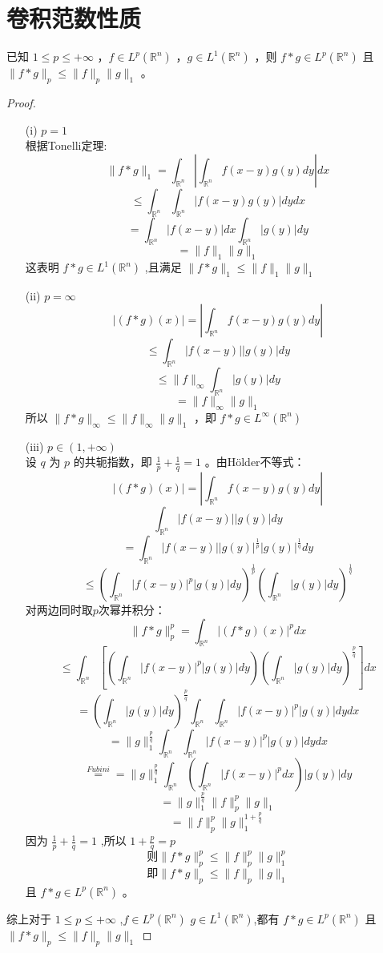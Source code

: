 \documentclass[linespread=1.5,openany]{book}%
\theoremstyle{plain}
\begin{document}
{{				\section{卷积范数性质}
				已知 \(1\leq p\leq +\infty\) ，\(f\in L^p(\mathbb{R}^n)\) ，\(g\in L^1(\mathbb{R}^n)\) ，则 \(f * g\in L^p(\mathbb{R}^n)\) 且 \(\|f * g\|_p\leq\|f\|_p\|g\|_1\) 。
				\begin{proof}
					\begin{itemize}	
						\item [(i)]\(p = 1\)\\
						根据Tonelli定理:\[\|f * g\|_1=\int_{\mathbb{R}^n}\left|\int_{\mathbb{R}^n}f(x - y)g(y)dy\right|dx\]
						\[ \leq\int_{\mathbb{R}^n}\int_{\mathbb{R}^n}|f(x - y)g(y)|dydx\]
						\[ =\int_{\mathbb{R}^n}|f(x - y)|dx\int_{\mathbb{R}^n}|g(y)|dy\]
						\[ =\|f\|_1\|g\|_1\]
						这表明 \(f * g\in L^1(\mathbb{R}^n)\) ,且满足 \(\|f * g\|_1\leq\|f\|_1\|g\|_1\)
						\item [(ii)]\(p = \infty\)\\
						\[|(f * g)(x)|=\left|\int_{\mathbb{R}^n}f(x - y)g(y)dy\right|\]
						\[\leq\int_{\mathbb{R}^n}|f(x - y)||g(y)|dy\]
						\[\leq\|f\|_{\infty}\int_{\mathbb{R}^n}|g(y)|dy\]
						\[=\|f\|_{\infty}\|g\|_1	\]
						所以 \(\|f * g\|_{\infty}\leq\|f\|_{\infty}\|g\|_1\) ，即 \(f * g\in L^{\infty}(\mathbb{R}^n)\) 
						\item [(iii)]\(p\in(1, +\infty)\)\\
						设 \(q\) 为 \(p\) 的共轭指数，即 \(\frac{1}{p}+\frac{1}{q}=1\) 。由Hölder不等式：
						\[
						|(f * g)(x)|=\left|\int_{\mathbb{R}^n}f(x - y)g(y)dy\right|\]
						\[ \int_{\mathbb{R}^n}|f(x - y)||g(y)|dy\]
						\[ =\int_{\mathbb{R}^n}|f(x - y)||g(y)|^{\frac{1}{p}}|g(y)|^{\frac{1}{q}}dy\]
						\[\leq\left(\int_{\mathbb{R}^n}|f(x - y)|^p|g(y)|dy\right)^{\frac{1}{p}}\left(\int_{\mathbb{R}^n}|g(y)|dy\right)^{\frac{1}{q}}
						\]
						对两边同时取\(p\)次幂并积分：
						\[
						\|f * g\|_p^p=\int_{\mathbb{R}^n}|(f * g)(x)|^pdx\]
						\[\leq\int_{\mathbb{R}^n}\left[\left(\int_{\mathbb{R}^n}|f(x - y)|^p|g(y)|dy\right)\left(\int_{\mathbb{R}^n}|g(y)|dy\right)^{\frac{p}{q}}\right]dx\]
						\[=\left(\int_{\mathbb{R}^n}|g(y)|dy\right)^{\frac{p}{q}}\int_{\mathbb{R}^n}\int_{\mathbb{R}^n}|f(x - y)|^p|g(y)|dydx\]
						\[=\|g\|_1^{\frac{p}{q}}\int_{\mathbb{R}^n}\int_{\mathbb{R}^n}|f(x - y)|^p|g(y)|dydx\] 
						\[\stackrel{Fubini}{=}
						=\|g\|_1^{\frac{p}{q}}\int_{\mathbb{R}^n}\left(\int_{\mathbb{R}^n}|f(x - y)|^pdx\right)|g(y)|dy\]\[
						=\|g\|_1^{\frac{p}{q}}\|f\|_p^p\|g\|_1\]
						\[=\|f\|_p^p\|g\|_1^{1 + \frac{p}{q}}
						\]
						因为 \(\frac{1}{p}+\frac{1}{q}=1\) ,所以 \(1+\frac{p}{q}=p\)  \[\text{则}\|f * g\|_p^p\leq\|f\|_p^p\|g\|_1^p\]   \[\text{即}\|f * g\|_p\leq\|f\|_p\|g\|_1\]  且 \(f * g\in L^p(\mathbb{R}^n)\) 。
					\end{itemize}
					综上对于 \(1\leq p\leq +\infty\) ,\(f\in L^p(\mathbb{R}^n)\) \(g\in L^1(\mathbb{R}^n)\),都有 \(f * g\in L^p(\mathbb{R}^n)\) 且 \(\|f * g\|_p\leq\|f\|_p\|g\|_1\) 
				\end{proof}
}}
\end{document}

